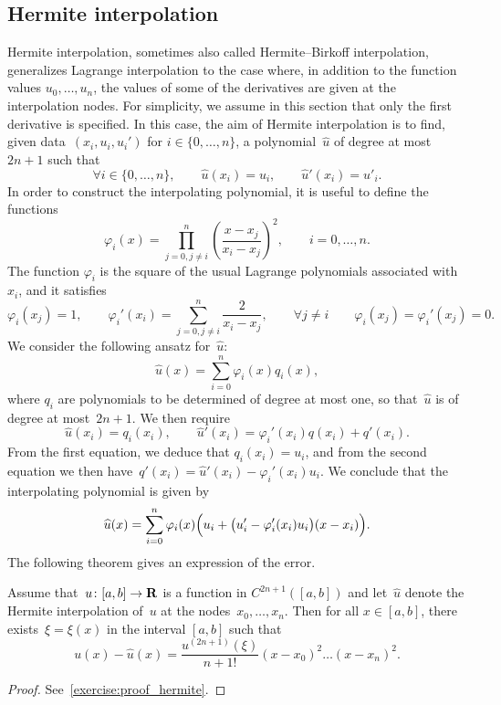 \subsection{Hermite interpolation}
Hermite interpolation,
sometimes also called Hermite--Birkoff interpolation,
generalizes Lagrange interpolation to the case where,
in addition to the function values $u_0, \dotsc, u_n$,
the values of some of the derivatives are given at the interpolation nodes.
For simplicity,
we assume in this section that only the first derivative is specified.
In this case, the aim of Hermite interpolation is to find,
given data~$(x_i, u_i, u_i')$ for $i \in \{0, \dotsc, n\}$,
a polynomial~$\widehat u$ of degree at most~$2n + 1$ such that
\[
    \forall i \in \{0, \dotsc, n\}, \qquad
    \widehat u(x_i) = u_i, \qquad
    \widehat u'(x_i) = u'_i.
\]
In order to construct the interpolating polynomial,
it is useful to define the functions
\[
    \varphi_{i}(x)
    = \prod_{j=0, j\neq i}^{n} \left( \frac{x-x_j}{x_i-x_j} \right)^2,
    \qquad i = 0, \dotsc, n.
\]
The function $\varphi_i$ is the square of the usual Lagrange polynomials associated with~$x_i$,
and it satisfies
\[
    \varphi_i(x_j) = 1,
    \qquad \varphi_i'(x_i) = \sum_{j=0,j\neq i}^{n} \frac{2}{x_i - x_j},
    \qquad \forall j \neq i \qquad \varphi_i(x_j) = \varphi_i'(x_j) = 0.
\]
We consider the following ansatz for~$\widehat u$:
\[
    \widehat u(x) = \sum_{i=0}^{n} \varphi_i(x) q_i(x),
\]
where $q_i$ are polynomials to be determined of degree at most one,
so that~$\widehat u$ is of degree at most~$2n+1$.
We then require
\[
    \widehat u(x_i) = q_i(x_i), \qquad \widehat u'(x_i) = \varphi_i'(x_i) q(x_i) + q'(x_i).
\]
From the first equation, we deduce that $q_i(x_i) = u_i$,
and from the second equation we then have~$q'(x_i) = \widehat u'(x_i) - \varphi_i'(x_i) u_i$.
We conclude that the interpolating polynomial is given by
\[
    \widehat u(x) = \sum_{i=0}^{n} \varphi_i(x) \Bigl(u_i + \bigl(u_i' - \varphi_i'(x_i) u_i\bigr) (x - x_i)\Bigr).
\]
The following theorem gives an expression of the error.
\begin{theorem}
    \label{theorem:hermite_interpolation}
    Assume that~$u\colon [a, b] \to \mathbf R$ is a function in $C^{2n+1}([a, b])$ and let~$\widehat u$
    denote the Hermite interpolation of~$u$ at the nodes~$x_0, \dotsc, x_n$.
    Then for all $x \in [a, b]$,
    there exists~$\xi = \xi(x)$ in the interval $[a, b]$ such that
    \[
        u(x) - \widehat u(x) = \frac{u^{(2n+1)}(\xi)}{n+1!} (x-x_0)^2 \dotsc (x - x_n)^2.
    \]
\end{theorem}
\begin{proof}
    See~\cref{exercise:proof_hermite}.
\end{proof}

